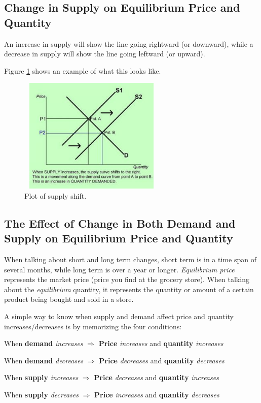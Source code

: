 \documentclass[a4paper, 12pt] {article}
\begin{document}
\subsection{Change in Supply on Equilibrium Price and Quantity}
An increase in supply will show the line going rightward (or downward), while
a decrease in supply will show the line going leftward (or upward).

Figure \ref{fig:supply_shift} shows an example of what this looks like.
\begin{figure}[h]
    \centering
    \includegraphics[height=5.5cm, width=7.0cm]{supply_shift.jpg}
    \caption{Plot of supply shift.}
    \label{fig:supply_shift}
\end{figure}

\subsection{The Effect of Change in Both Demand and Supply on Equilibrium Price
and Quantity}
When talking about short and long term changes, short term is in a time span of
several months, while long term is over a year or longer. \emph{Equilibrium
price} represents the market price (price you find at the grocery store).
When talking about the \emph{equilibrium} quantity, it represents the quantity
or amount of a certain product being bought and sold in a store.

A simple way to know when supply and demand affect price and quantity
increases/decreases is by memorizing the four conditions:
\begin{description}
\item When \textbf{demand} \emph{increases} $\Longrightarrow$ \textbf{Price}
    \emph{increases} and \textbf{quantity} \emph{increases}
\item When \textbf{demand} \emph{decreases} $\Longrightarrow$ \textbf{Price}
    \emph{decreases} and \textbf{quantity} \emph{decreases}
\item When \textbf{supply} \emph{increases} $\Longrightarrow$ \textbf{Price}
    \emph{decreases} and \textbf{quantity} \emph{increases}
\item When \textbf{supply} \emph{decreases} $\Longrightarrow$ \textbf{Price}
    \emph{increases} and \textbf{quantity} \emph{decreases}
\end{description}
\end{document}
